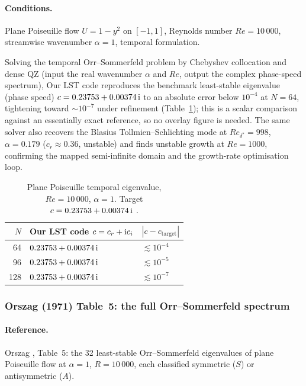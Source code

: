 \documentclass[11pt]{article}
\begin{document}
\paragraph{Conditions.} Plane Poiseuille flow $U=1-y^2$ on $[-1,1]$, Reynolds number $Re=10\,000$,
streamwise wavenumber $\alpha=1$, temporal formulation.

Solving the temporal Orr--Sommerfeld problem by Chebyshev collocation and dense QZ (input the real
wavenumber $\alpha$ and $Re$, output the complex phase-speed spectrum), Our LST code reproduces the
benchmark least-stable eigenvalue (phase speed) $c=0.23753+0.00374\,\mathrm{i}$ to an absolute error
below $10^{-4}$ at $N=64$, tightening toward $\sim\!10^{-7}$ under refinement (Table~\ref{tab:orszag}); this is a scalar comparison against an
essentially exact reference, so no overlay figure is needed. The same solver also recovers the
Blasius Tollmien--Schlichting mode at $Re_{\delta^\ast}=998$, $\alpha=0.179$ ($c_r\approx0.36$,
unstable) and finds unstable growth at $Re=1000$, confirming the mapped semi-infinite domain and
the growth-rate optimisation loop.

\begin{table}[htbp]
\centering
\small
\caption{Plane Poiseuille temporal eigenvalue, $Re=10\,000$, $\alpha=1$. Target
$c=0.23753+0.00374\,\mathrm{i}$ \cite{orszag1971}.}
\label{tab:orszag}
\begin{tabular}{@{}rll@{}}
\toprule
$N$ & Our LST code $c=c_r+\mathrm{i} c_i$ & $|c-c_{\text{target}}|$ \\
\midrule
64  & $0.23753 + 0.00374\,\mathrm{i}$ & $\lesssim 10^{-4}$ \\
96  & $0.23753 + 0.00374\,\mathrm{i}$ & $\lesssim 10^{-5}$ \\
128 & $0.23753 + 0.00374\,\mathrm{i}$ & $\lesssim 10^{-7}$ \\
\bottomrule
\end{tabular}
\end{table}

\subsubsection{Orszag (1971) Table~5: the full Orr--Sommerfeld spectrum}
\label{sec:orszag-spectrum}

\paragraph{Reference.} Orszag \cite{orszag1971}, Table~5: the 32 least-stable Orr--Sommerfeld
eigenvalues of plane Poiseuille flow at $\alpha=1$, $R=10\,000$, each classified symmetric ($S$) or
antisymmetric ($A$).
\end{document}
